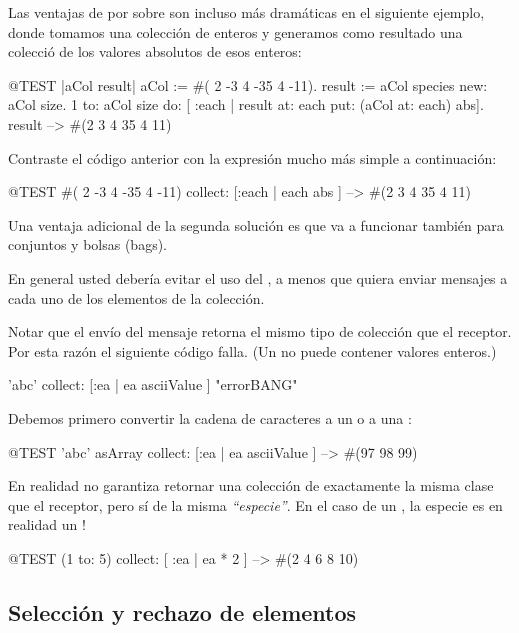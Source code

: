 \documentclass[a4paper,10pt,twoside]{book}
\begin{document}
Las ventajas de  por sobre  son incluso m\'as dram\'aticas en el siguiente ejemplo, donde tomamos una colecci\'on de enteros y generamos como resultado una colecci\'o de los valores absolutos de esos enteros:

\begin{code}{@TEST |aCol result|}
aCol :=  #( 2 -3 4 -35 4 -11).
result := aCol species new: aCol size.
1 to: aCol size do: [ :each | result at: each put: (aCol at: each) abs].
result --> #(2 3 4 35 4 11)
\end{code}
\noindent
Contraste el c\'odigo anterior con la expresi\'on mucho m\'as simple a continuaci\'on:
\begin{code}{@TEST}
#( 2 -3 4 -35 4 -11) collect: [:each | each abs ] --> #(2 3 4 35 4 11)
\end{code}
\noindent
Una ventaja adicional de la segunda soluci\'on es que va a funcionar tambi\'en para conjuntos y bolsas (bags).

En general usted deber\'ia evitar el uso del , a menos que quiera enviar mensajes a cada uno de los elementos de la colecci\'on.

Notar que el env\'io del mensaje  retorna el mismo tipo de colecci\'on que el receptor.
Por esta raz\'on el siguiente c\'odigo falla.
(Un  no puede contener valores enteros.)
\begin{code}{}
'abc' collect: [:ea | ea asciiValue ]      "errorBANG"
\end{code}
\noindent
Debemos primero convertir la cadena de caracteres a un  o a una :
\begin{code}{@TEST}
'abc' asArray collect: [:ea | ea asciiValue ] --> #(97 98 99)
\end{code}

En realidad  no garantiza retornar una colecci\'on de exactamente la misma clase que el receptor, pero s\'i de la misma \emph{``especie''}. En el caso de un , la especie es en realidad un !
\begin{code}{@TEST}
(1 to: 5) collect: [ :ea | ea * 2 ] --> #(2 4 6 8 10)
\end{code}

\subsection{Selecci\'on y rechazo de elementos}
\end{document}
